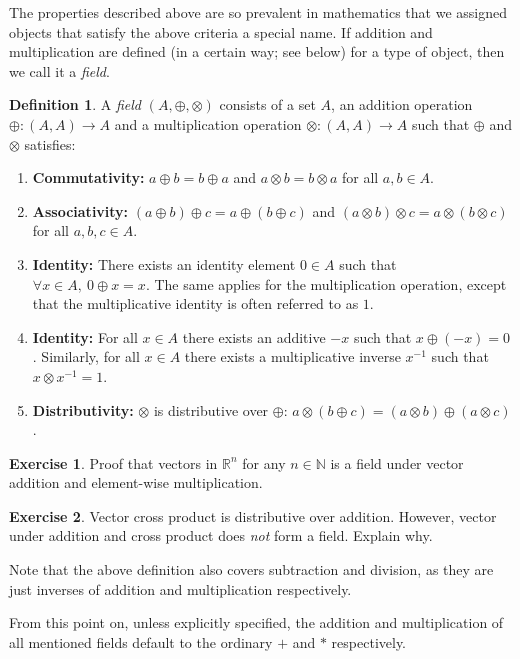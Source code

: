 \documentclass[12pt]{article}
\theoremstyle{definition}
\newtheorem{defn}{Definition}[section]
\newtheorem{ex}{Exercise}[section]
\newcommand{\RR}{\mathbb{R}}
\newcommand{\NN}{\mathbb{N}}
\begin{document}
	The properties described above are so prevalent in mathematics that we assigned objects that satisfy the above criteria a special name. If addition and multiplication are defined (in a certain way; see below) for a type of object, then we call it a \emph{field}.
	
	\begin{defn}
		A \emph{field} $(A, \oplus, \otimes)$ consists of a set $A$, an addition operation $\oplus: (A, A) \to A$ and a multiplication operation $\otimes: (A, A) \to A$ such that $\oplus$ and $\otimes$ satisfies:
		\begin{enumerate}
			\item \textbf{Commutativity:} $a \oplus b = b \oplus a$ and $a \otimes b = b \otimes a$ for all $a, b \in A$.
			\item \textbf{Associativity:} $(a \oplus b) \oplus c = a \oplus (b \oplus c)$ and $(a \otimes b) \otimes c = a \otimes (b \otimes c)$ for all $a, b, c \in A$.
			\item \textbf{Identity:} There exists an identity element $0 \in A$ such that $\forall x \in A,\ 0 \oplus x = x$. The same applies for the multiplication operation, except that the multiplicative identity is often referred to as $1$.
			\item \textbf{Identity:} For all $x \in A$ there exists an additive $-x$ such that $x \oplus (-x) = 0$. Similarly, for all $x \in A$ there exists a multiplicative inverse $x^{-1}$ such that $x \otimes x^{-1} = 1$.
			\item \textbf{Distributivity:} $\otimes$ is distributive over $\oplus$: $a \otimes (b \oplus c) = (a \otimes b) \oplus (a \otimes c)$.
		\end{enumerate}
	\end{defn}
	
	\begin{ex}
		Proof that vectors in $\RR^n$ for any $n \in \NN$ is a field under vector addition and element-wise multiplication.
	\end{ex}
	
	\begin{ex}
		Vector cross product is distributive over addition. However, vector under addition and cross product does \emph{not} form a field. Explain why.
	\end{ex}
	
	Note that the above definition also covers subtraction and division, as they are just inverses of addition and multiplication respectively.
	
	From this point on, unless explicitly specified, the addition and multiplication of all mentioned fields default to the ordinary $+$ and $*$ respectively.
	
\end{document}
